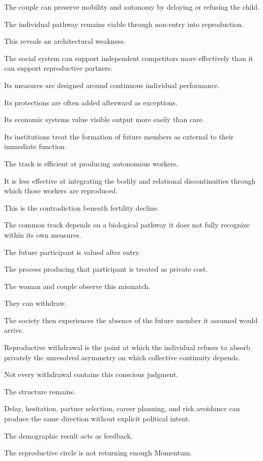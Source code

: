 The couple can preserve mobility and autonomy by delaying or refusing the child.

The individual pathway remains viable through non-entry into reproduction.

This reveals an architectural weakness.

The social system can support independent competitors more effectively than it can support reproductive partners.

Its measures are designed around continuous individual performance.

Its protections are often added afterward as exceptions.

Its economic systems value visible output more easily than care.

Its institutions treat the formation of future members as external to their immediate function.

The track is efficient at producing autonomous workers.

It is less effective at integrating the bodily and relational discontinuities through which those workers are reproduced.

This is the contradiction beneath fertility decline.

The common track depends on a biological pathway it does not fully recognize within its own measures.

The future participant is valued after entry.

The process producing that participant is treated as private cost.

The woman and couple observe this mismatch.

They can withdraw.

The society then experiences the absence of the future member it assumed would arrive.

Reproductive withdrawal is the point at which the individual refuses to absorb privately the unresolved asymmetry on which collective continuity depends.

Not every withdrawal contains this conscious judgment.

The structure remains.

Delay, hesitation, partner selection, career planning, and risk avoidance can produce the same direction without explicit political intent.

The demographic result acts as feedback.

The reproductive circle is not returning enough Momentum.

